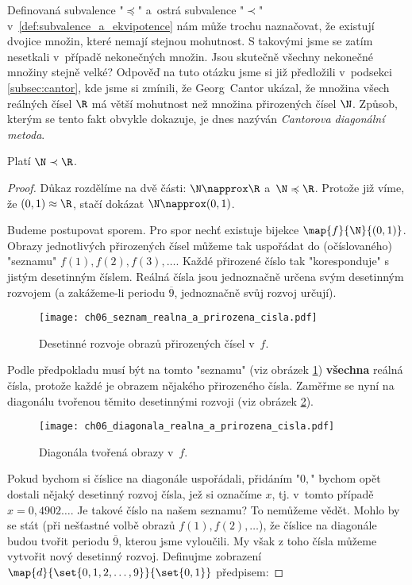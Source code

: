 Definovaná subvalence "$\preccurlyeq$" a~ostrá subvalence "$\prec$" v~\ref{def:subvalence_a_ekvipotence} nám může trochu naznačovat, že existují dvojice množin, které nemají stejnou mohutnost. S takovými jsme se zatím nesetkali v~případě nekonečných množin. Jsou skutečně všechny nekonečné množiny stejně velké? Odpověď na tuto otázku jsme si již předložili v~podsekci \ref{subsec:cantor}, kde jsme si zmínili, že Georg~Cantor ukázal, že množina všech reálných čísel $\R$ má větší mohutnost než množina přirozených čísel $\N$. Způsob, kterým se tento fakt obvykle dokazuje, je dnes nazýván \emph{Cantorova diagonální metoda}.
\begin{theorem}\label{thm:N_a_R}
    Platí $\N\prec\R$.
\end{theorem}
\begin{proof}
    Důkaz rozdělíme na dvě části: $\N\napprox\R$ a~$\N\preccurlyeq\R$. Protože již víme, že $(0,1)\approx\R$, stačí dokázat $\N\napprox(0,1)$.\par
    Budeme postupovat sporem. Pro spor nechť existuje bijekce $\map{f}{\N}{(0,1)}$. Obrazy jednotlivých přirozených čísel můžeme tak uspořádat do (očíslovaného) "seznamu" $f(1),f(2),f(3),\dots$. Každé přirozené číslo tak "koresponduje" s jistým desetinným číslem. Reálná čísla jsou jednoznačně určena svým desetinným rozvojem (a zakážeme-li periodu $\overline{9}$, jednoznačně svůj rozvoj určují).
    \begin{figure}[H]
        \centering
        \texttt{[image: ch06\_seznam\_realna\_a\_prirozena\_cisla.pdf]}
        \caption{Desetinné rozvoje obrazů přirozených čísel v~$f$.}
        \label{fig:seznam_realna_a_prirozena_cisla}
    \end{figure}
    Podle předpokladu musí být na tomto "seznamu" (viz obrázek \ref{fig:seznam_realna_a_prirozena_cisla}) \textbf{všechna} reálná čísla, protože každé je obrazem nějakého přirozeného čísla. Zaměřme se nyní na diagonálu tvořenou těmito desetinnými rozvoji (viz obrázek \ref{fig:diagonala_realna_a_prirozena_cisla}).
    \begin{figure}[H]
        \centering
        \texttt{[image: ch06\_diagonala\_realna\_a\_prirozena\_cisla.pdf]}
        \caption{Diagonála tvořená obrazy v~$f$.}
        \label{fig:diagonala_realna_a_prirozena_cisla}
    \end{figure}
    Pokud bychom si číslice na diagonále uspořádali, přidáním "$0,$" bychom opět dostali nějaký desetinný rozvoj čísla, jež si označíme $x$, tj. v~tomto případě $x=0,4902\dots$. Je takové číslo na našem seznamu? To nemůžeme vědět. Mohlo by se stát (při nešťastné volbě obrazů $f(1),f(2),\dots$), že číslice na diagonále budou tvořit periodu $\overline{9}$, kterou jsme vyloučili. My však z toho čísla můžeme vytvořit nový desetinný rozvoj. Definujme zobrazení $\map{d}{\set{0,1,2,\dots,9}}{\set{0,1}}$ předpisem:

\end{proof}
